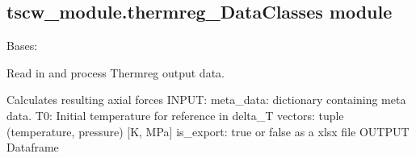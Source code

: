 \documentclass[letterpaper,10pt,english]{sphinxmanual}
\begin{document}
\subsection{tscw\_module.thermreg\_DataClasses module}
\label{\detokenize{tscw_module:module-tscw_module.thermreg_DataClasses}}\label{\detokenize{tscw_module:tscw-module-thermreg-dataclasses-module}}

\begin{fulllineitems}
\label{\detokenize{tscw_module:tscw_module.thermreg_DataClasses.ThermregData}}
\pysigstartsignatures
{}
\pysigstopsignatures
\sphinxAtStartPar
Bases: 

\sphinxAtStartPar
Read in and process Thermreg output data.

\begin{fulllineitems}
\label{\detokenize{tscw_module:tscw_module.thermreg_DataClasses.ThermregData.calculate_axial_forces}}
\pysigstartsignatures
{}
\pysigstopsignatures
\sphinxAtStartPar
Calculates resulting axial forces
INPUT:
meta\_data: dictionary containing meta data.
T0: Initial temperature for reference in delta\_T
vectors: tuple \sphinxhyphen{} (temperature, pressure) {[}K, MPa{]}
is\_export: true or false \sphinxhyphen{} as a xlsx file
OUTPUT
Dataframe

\end{fulllineitems}


\end{fulllineitems}
\end{document}
